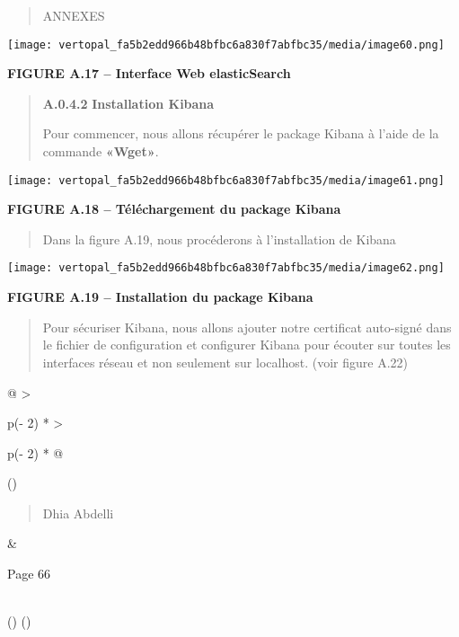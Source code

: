 \documentclass[
]{article}
\begin{document}
\begin{quote}
ANNEXES
\end{quote}

\texttt{[image: vertopal\_fa5b2edd966b48bfbc6a830f7abfbc35/media/image60.png]}

\textbf{FIGURE A.17 -- Interface Web elasticSearch}

\begin{quote}
\textbf{A.0.4.2} \textbf{Installation Kibana}

Pour commencer, nous allons récupérer le package Kibana à l'aide de la
commande \textbf{«Wget»}.
\end{quote}

\texttt{[image: vertopal\_fa5b2edd966b48bfbc6a830f7abfbc35/media/image61.png]}

\textbf{FIGURE A.18 -- Téléchargement du package Kibana}

\begin{quote}
Dans la figure A.19, nous procéderons à l'installation de Kibana
\end{quote}

\texttt{[image: vertopal\_fa5b2edd966b48bfbc6a830f7abfbc35/media/image62.png]}

\textbf{FIGURE A.19 -- Installation du package Kibana}

\begin{quote}
Pour sécuriser Kibana, nous allons ajouter notre certificat auto-signé
dans le fichier de configuration et configurer Kibana pour écouter sur
toutes les interfaces réseau et non seulement sur localhost. (voir
figure A.22)
\end{quote}

\begin{longtable}[]{@{}
  >{\raggedright\arraybackslash}p{(\columnwidth - 2\tabcolsep) * }
  >{\raggedright\arraybackslash}p{(\columnwidth - 2\tabcolsep) * }@{}}
\toprule()
\begin{minipage}[b]{\linewidth}\raggedright
\begin{quote}
Dhia Abdelli
\end{quote}
\end{minipage} & \begin{minipage}[b]{\linewidth}\raggedright
Page 66
\end{minipage} \\
\midrule()
\endhead
\bottomrule()
\end{longtable}
\end{document}
